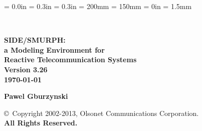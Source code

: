 \newcommand{\references}[1]{%
}%

\newenvironment{doublespace}%
{\renewcommand{\baselinestretch}{1.50} \large \normalsize}%
{\renewcommand{\baselinestretch}{1} \large \normalsize}%

\newenvironment{singlespace}%
{\renewcommand{\baselinestretch}{1} \large \normalsize}%
{\renewcommand{\baselinestretch}{1.50} \large \normalsize}%

\newcommand{\lansf}{{\sc LANSF}}
\newcommand{\smurph}{{\sc SIDE}}
\newcommand{\dsd}{{\sc DSD}}
\newcommand{\smurphtt}{{\tt SIDE}}
\newcommand{\smurphrm}{{SIDE}}
\newcommand{\smurphtts}{{\tt side}}
\newcommand{\serdel}{{\sc SERDEL}}
\newcommand{\djgpp}{{\sc DJGPP}}

\topmargin = 0.0in
\oddsidemargin = 0.3in
\evensidemargin = 0.3in
\textheight = 200mm
\textwidth = 150mm
\parindent = 0in
\parskip = 1.5mm

\sloppy



\begin{titlepage}

\vspace*{0.35in}

\begin{center}

 \\

\vspace*{0.45in}

\Huge\bf SIDE/SMURPH:\vspace{0.1in} \\

\huge\bf a Modeling Environment for\vspace{0.1in} \\

Reactive Telecommunication Systems\vspace{0.25in}\\

\Large Version 3.26 \\

\large {\today} \\

\vspace{1.1in}

\bf Pawel Gburzynski \\

\vspace*{1.5in}

{\Large {\copyright}~Copyright 2002-2013, Olsonet Communications Corporation.\\
{\bf All Rights Reserved.}}

\normalsize

\end{center}

\end{titlepage}

